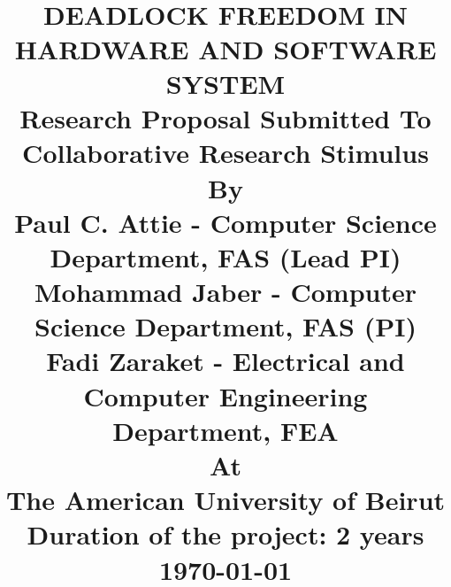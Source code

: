 
\title{	\normalsize \textsc{} 	%
		 	\\[2.0cm]													%
			\HRule{0.5pt} \\										%
			\LARGE \textbf{\uppercase{Deadlock Freedom in Hardware and Software System}}	%
			\HRule{2pt} \\ [0.5cm]								%
			\large  			
			Research Proposal Submitted To Collaborative Research Stimulus\\[0.5cm]
			By\\[0.5cm]
			Paul C. Attie - Computer Science Department, FAS (Lead PI) \\[0.5cm]
			Mohammad Jaber - Computer Science Department, FAS (PI) \\[0.5cm]
			Fadi Zaraket  - Electrical and Computer Engineering Department, FEA \\[0.5cm]
			At \\[0.5cm]
			The American University of Beirut \\ [1cm]
                        Duration of the project: 2 years \\ [1cm]
			\today									%
		}

\author{
}




